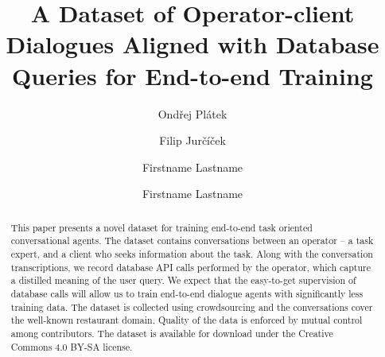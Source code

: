 \documentclass[runningheads,a4paper]{llncs}
\def\OP#1{#1}  %
\begin{document}


\title{A Dataset of Operator-client Dialogues Aligned with Database Queries for End-to-end Training}

\author{Ondřej Plátek \and Filip Jurčíček}

\iftrue %
\author{Firstname Lastname \and Firstname Lastname }
\fi
			
\maketitle

\begin{abstract}
    This paper presents a novel dataset for training end-to-end task oriented conversational agents.
    The dataset contains conversations between an operator – a task expert, and a client who seeks information about the task.
    Along with the conversation transcriptions, we record database API calls performed by the operator, which capture a distilled meaning of the user query.
    We expect that the easy-to-get supervision of database calls will allow us to train end-to-end dialogue agents with significantly less training data.
 	The dataset is collected using crowdsourcing and the conversations cover the well-known restaurant domain.
    Quality of the data is enforced by mutual control among contributors.  %
    The dataset is available for download under the Creative Commons 4.0 BY-SA license.
\end{abstract}

\vspace{-1.00em}
\vspace{-1.00em}
\end{document}
